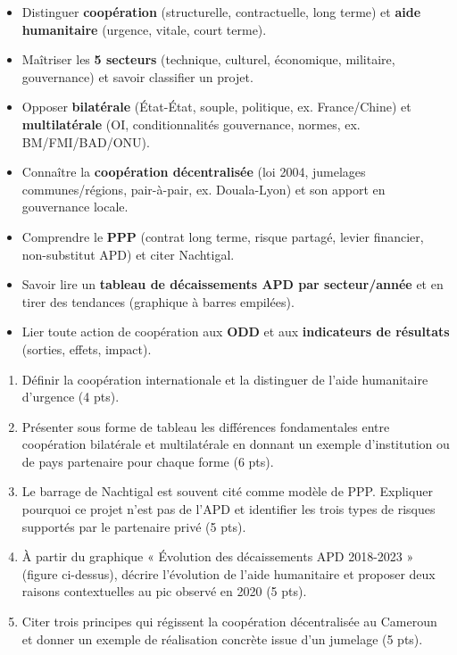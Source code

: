 \documentclass[11pt]{article}
\begin{document}
\begin{aretenir}
\begin{itemize}
    \item Distinguer \textbf{coopération} (structurelle, contractuelle, long terme) et \textbf{aide humanitaire} (urgence, vitale, court terme).
    \item Maîtriser les \textbf{5 secteurs} (technique, culturel, économique, militaire, gouvernance) et savoir classifier un projet.
    \item Opposer \textbf{bilatérale} (État-État, souple, politique, ex. France/Chine) et \textbf{multilatérale} (OI, conditionnalités gouvernance, normes, ex. BM/FMI/BAD/ONU).
    \item Connaître la \textbf{coopération décentralisée} (loi 2004, jumelages communes/régions, pair-à-pair, ex. Douala-Lyon) et son apport en gouvernance locale.
    \item Comprendre le \textbf{PPP} (contrat long terme, risque partagé, levier financier, non-substitut APD) et citer Nachtigal.
    \item Savoir lire un \textbf{tableau de décaissements APD par secteur/année} et en tirer des tendances (graphique à barres empilées).
    \item Lier toute action de coopération aux \textbf{ODD} et aux \textbf{indicateurs de résultats} (sorties, effets, impact).
\end{itemize}
\end{aretenir}

\begin{exercice}
\begin{enumerate}
    \item Définir la coopération internationale et la distinguer de l'aide humanitaire d'urgence (4 pts).
    \item Présenter sous forme de tableau les différences fondamentales entre coopération bilatérale et multilatérale en donnant un exemple d'institution ou de pays partenaire pour chaque forme (6 pts).
    \item Le barrage de Nachtigal est souvent cité comme modèle de PPP. Expliquer pourquoi ce projet n'est pas de l'APD et identifier les trois types de risques supportés par le partenaire privé (5 pts).
    \item À partir du graphique « Évolution des décaissements APD 2018-2023 » (figure ci-dessus), décrire l'évolution de l'aide humanitaire et proposer deux raisons contextuelles au pic observé en 2020 (5 pts).
    \item Citer trois principes qui régissent la coopération décentralisée au Cameroun et donner un exemple de réalisation concrète issue d'un jumelage (5 pts).
\end{enumerate}
\end{exercice}
\end{document}
